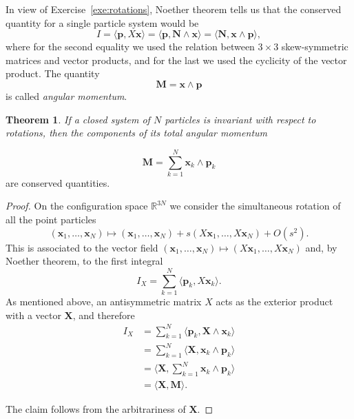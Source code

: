\documentclass[english,fontsize=11pt,paper=a5,oneside]{scrbook}
\newcommand{\R}{\mathbb{R}}
\newcommand{\bx}{\bm{x}}
\newcommand{\bp}{\bm{p}}
\newcommand{\lag}{\langle}
\newcommand{\rag}{\rangle}
\newtheorem{theorem}{Theorem}[chapter]
\theoremstyle{definition}
\begin{document}
In view of Exercise~\ref{exe:rotations}, Noether theorem tells us that the conserved quantity for a single particle system would be
\begin{equation}
  I = \lag\bp, X\bx\rag = \lag\bp, \bm{N}\wedge \bx\rag = \lag\bm{N}, \bx\wedge \bp \rag,
\end{equation}
where for the second equality we used the relation between $3\times3$ skew-symmetric matrices and vector products, and for the last we used the cyclicity of the vector product.
The quantity
\begin{equation}
  \bm{M} = \bx \wedge \bp
\end{equation}
is called \emph{angular momentum}.

\begin{theorem}
  If a closed system of $N$ particles is invariant with respect to rotations, then the components of its \emph{total angular momentum}
\end{theorem}
\begin{equation}
  \bm{M} = \sum_{k=1}^N \bx_k \wedge \bp_k
\end{equation}
are conserved quantities.
\begin{proof}
  On the configuration space $\R^{3N}$ we consider the simultaneous rotation of all the point particles
  \begin{equation}
    (\bx_1,\ldots,\bx_N) \mapsto
    (\bx_1,\ldots,\bx_N) +
    s (X\bx_1,\ldots,X\bx_N) + O(s^2).
  \end{equation}
  This is associated to the vector field $(\bx_1,\ldots,\bx_N) \mapsto (X\bx_1,\ldots,X\bx_N)$ and, by Noether theorem, to the first integral
  \begin{equation}
    I_X = \sum_{k=1}^N \lag\bp_k, X\bx_k\rag.
  \end{equation}
  As mentioned above, an antisymmetric matrix $X$ acts as the exterior product with a vector $\bm{X}$, and therefore
  \begin{align}
    I_X & = \sum_{k=1}^N \lag\bp_k, \bm{X}\wedge\bx_k\rag  \\
        & = \sum_{k=1}^N \lag\bm{X}, \bx_k\wedge \bp_k\rag \\
        & = \lag\bm{X}, \sum_{k=1}^N \bx_k\wedge \bp_k\rag \\
        & = \lag\bm{X},\bm{M}\rag.
  \end{align}

  The claim follows from the arbitrariness of $\bm{X}$.
\end{proof}
\end{document}
